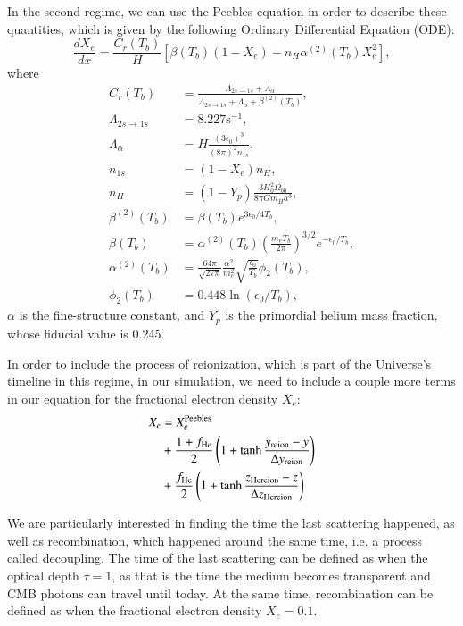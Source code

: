 \documentclass{aa}
\begin{document}
In the second regime, we can use the Peebles equation in order to describe these quantities, which is given by the following Ordinary Differential Equation (ODE):
\begin{equation}
\frac{dX_e}{dx} = \frac{C_r(T_b)}{H} \left[\beta(T_b)(1-X_e) - n_H
\alpha^{(2)}(T_b)X_e^2\right],
\end{equation}
where
\begin{align}
C_r(T_b) &= \frac{\Lambda_{2s\rightarrow1s} + \Lambda_{\alpha}}{\Lambda_{2s\rightarrow1s} + \Lambda_{\alpha} + \beta^{(2)}(T_b)},\\
\Lambda_{2s\rightarrow1s} &= 8.227 \textrm{s}^{-1},\\
\Lambda_{\alpha} &= H\frac{(3\epsilon_0)^3}{(8\pi)^2 n_{1s}},\\
n_{1s} &= (1-X_e)n_H,\\
n_H &= (1-Y_p)\frac{3H_0^2\Omega_{b0}}{8\pi G m_H a^3},\\
\beta^{(2)}(T_b) &= \beta(T_b) e^{3\epsilon_0/4T_b},\\
\beta(T_b) &= \alpha^{(2)}(T_b) \left(\frac{m_eT_b}{2\pi}\right)^{3/2} e^{-\epsilon_0/T_b},\\
\alpha^{(2)}(T_b) &= \frac{64\pi}{\sqrt{27\pi}}\frac{\alpha^2}{m_e^2}\sqrt{\frac{\epsilon_0}{T_b}}\phi_2(T_b),\\
\phi_2(T_b) &= 0.448\ln(\epsilon_0/T_b),
\end{align}
$\alpha$ is the fine-structure constant, and $Y_p$ is the primordial helium mass fraction, whose fiducial value is 0.245.

In order to include the process of reionization, which is part of the Universe's timeline in this regime, in our simulation, we need to include a couple more terms in our equation for the fractional electron density $X_e$:
\begin{align}
X_e &= X_e^{\rm Peebles}\nonumber\\ &+ \frac{1+f_{\rm He}}{2}\left(1+\tanh\frac{y_{\rm reion}-y}{\Delta y_{\rm reion}}\right)\\ &+ \frac{f_{\rm He}}{2}\left(1 + \tanh \frac{z_{\rm He reion}-z}{\Delta z_{\rm He reion}}\right)\nonumber
\end{align}

We are particularly interested in finding the time the last scattering happened, as well as recombination, which happened around the same time, i.e. a process called decoupling. The time of the last scattering can be defined as when the optical depth $\tau=1$, as that is the time the medium becomes transparent and CMB photons can travel until today. At the same time, recombination can be defined as when the fractional electron density $X_e = 0.1$.
\end{document}
